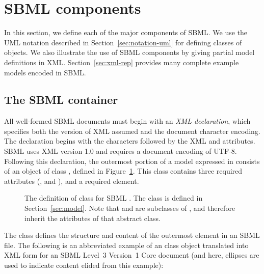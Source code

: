 
\section{SBML components}
\label{sec:elements}

In this section, we define each of the major components of SBML.
We use the UML notation described in
Section~\ref{sec:notation-uml} for defining classes of objects.
We also illustrate the use of SBML components by giving partial
model definitions in XML.  Section~\ref{sec:xml-rep} provides many
complete example models encoded in SBML.


\subsection{The SBML container}
\label{sec:sbml}

All well-formed SBML documents must begin with an \emph{XML
  declaration}, which specifies both the version of XML assumed
and the document character encoding.  The declaration begins with
the characters  followed by the XML 
and  attributes.  SBML \thisL uses XML version 1.0
and requires a document encoding of UTF-8.  Following this
declaration, the outermost portion of a model expressed in \thisL
consists of an object of class \SBML, defined in
Figure~\ref{fig:sbml}.  This class contains three required
attributes (,  and ), and
a required  element.

\begin{figure}[htb]
  \centering
  \small
  
  \caption{The definition of class \SBML for SBML \thisLV.  The
    class \Model is defined in Section~\ref{sec:model}.  Note that
    \SBML and \Model are subclasses of \SBase, and therefore
    inherit the attributes of that abstract class.}
  \label{fig:sbml}
\end{figure}

The \SBML class defines the structure and content of the
 outermost element in an SBML file.  The following is
an abbreviated example of an \SBML class object translated into
XML form for an SBML Level~3 Version~1 Core document (and here,
ellipses are used to indicate content elided from this example):

